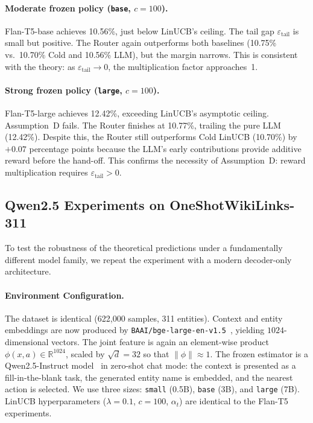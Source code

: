 \paragraph{Moderate frozen policy (\texttt{base}, $c=100$).}
Flan-T5-base achieves 10.56\%, just below LinUCB's ceiling. The tail gap $\varepsilon_{\mathrm{tail}}$ is small but positive. The Router again outperforms both baselines (10.75\% vs.\ 10.70\% Cold and 10.56\% LLM), but the margin narrows. This is consistent with the theory: as $\varepsilon_{\mathrm{tail}} \to 0$, the multiplication factor approaches~1.

\paragraph{Strong frozen policy (\texttt{large}, $c=100$).}
Flan-T5-large achieves 12.42\%, exceeding LinUCB's asymptotic ceiling. Assumption~D fails. The Router finishes at 10.77\%, trailing the pure LLM (12.42\%). Despite this, the Router still outperforms Cold LinUCB (10.70\%) by $+0.07$ percentage points because the LLM's early contributions provide additive reward before the hand-off. This confirms the necessity of Assumption~D: reward multiplication requires $\varepsilon_{\mathrm{tail}} > 0$.

\subsection{Qwen2.5 Experiments on OneShotWikiLinks-311}
\label{sec:wiki_v3}

To test the robustness of the theoretical predictions under a fundamentally different model family, we repeat the experiment with a modern decoder-only architecture.

\paragraph{Environment Configuration.}
The dataset is identical (622{,}000 samples, 311 entities). Context and entity embeddings are now produced by \texttt{BAAI/bge-large-en-v1.5}~\cite{xiao2024bge}, yielding $1024$-dimensional vectors. The joint feature is again an element-wise product $\phi(x,a) \in \mathbb{R}^{1024}$, scaled by $\sqrt{d}=32$ so that $\|\phi\| \approx 1$. The frozen estimator is a Qwen2.5-Instruct model~\cite{qwen2024qwen25} in zero-shot chat mode: the context is presented as a fill-in-the-blank task, the generated entity name is embedded, and the nearest action is selected. We use three sizes: \texttt{small} (0.5B), \texttt{base} (3B), and \texttt{large} (7B). LinUCB hyperparameters ($\lambda=0.1$, $c=100$, $\alpha_t$) are identical to the Flan-T5 experiments.

